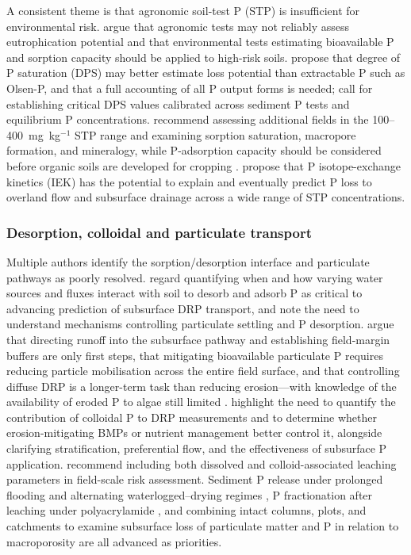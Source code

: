 A consistent theme is that agronomic soil-test P (STP) is insufficient for environmental risk. \textcite{Sharpley1995} argue that agronomic tests may not reliably assess eutrophication potential and that environmental tests estimating bioavailable P and sorption capacity should be applied to high-risk soils. \textcite{Hooda1999} propose that degree of P saturation (DPS) may better estimate loss potential than extractable P such as Olsen-P, and that a full accounting of all P output forms is needed; \textcite{Nguyen2002} call for establishing critical DPS values calibrated across sediment P tests and equilibrium P concentrations. \textcite{Osterholz2020} recommend assessing additional fields in the 100--400~mg~kg$^{-1}$ STP range and examining sorption saturation, macropore formation, and mineralogy, while P-adsorption capacity should be considered before organic soils are developed for cropping \parencite{MILLER1979}. \textcite{McDowell2001} propose that P isotope-exchange kinetics (IEK) has the potential to explain and eventually predict P loss to overland flow and subsurface drainage across a wide range of STP concentrations.

\subsubsection{Desorption, colloidal and particulate transport}

Multiple authors identify the sorption/desorption interface and particulate pathways as poorly resolved. \textcite{Mumbi2025} regard quantifying when and how varying water sources and fluxes interact with soil to desorb and adsorb P as critical to advancing prediction of subsurface DRP transport, and \textcite{Flores2021} note the need to understand mechanisms controlling particulate settling and P desorption. \textcite{Uusitalo2003} argue that directing runoff into the subsurface pathway and establishing field-margin buffers are only first steps, that mitigating bioavailable particulate P requires reducing particle mobilisation across the entire field surface, and that controlling diffuse DRP is a longer-term task than reducing erosion---with knowledge of the availability of eroded P to algae still limited \parencite{Ulén2007}. \textcite{Wilson2019} highlight the need to quantify the contribution of colloidal P to DRP measurements and to determine whether erosion-mitigating BMPs or nutrient management better control it, alongside clarifying stratification, preferential flow, and the effectiveness of subsurface P application. \textcite{Norgaard2013} recommend including both dissolved and colloid-associated leaching parameters in field-scale risk assessment. Sediment P release under prolonged flooding and alternating waterlogged--drying regimes \parencite{Nguyen2002}, P fractionation after leaching under polyacrylamide \parencite{Jiang2010}, and combining intact columns, plots, and catchments to examine subsurface loss of particulate matter and P in relation to macroporosity \parencite{Laubel1999} are all advanced as priorities.

